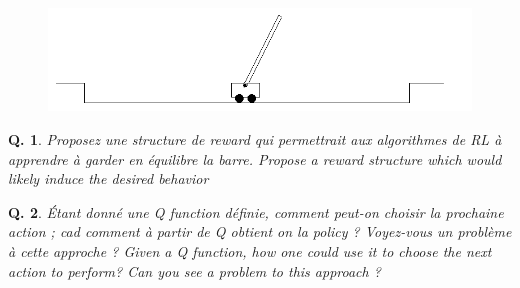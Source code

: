 \documentclass[a4paper]{exam}
\newtheorem{question}{{\bf Q.}}[section]
\begin{document}
\begin{figure}[h]
	\begin{center}
		\includegraphics[width=15cm]{pole-balancing.png}
	\end{center}
\end{figure}

\begin{question}
	Proposez une structure de reward qui permettrait aux algorithmes de RL à apprendre à garder en équilibre la barre. \em{Propose a reward structure which would likely induce the desired behavior}
\end{question}

\begin{question}
	Étant donné une Q function définie, comment peut-on choisir la prochaine action ; cad comment à partir de Q obtient on la policy ? Voyez-vous un problème à cette approche ? \em{Given a Q function, how one could use it to choose the next action to perform? Can you see a problem to this approach ?}
\end{question}
\end{document}
